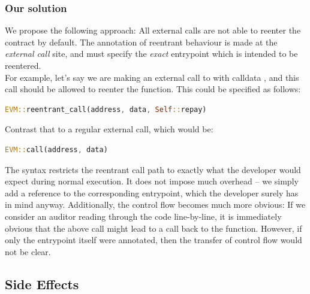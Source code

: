 \subsubsection{Our solution}
We propose the following approach: All external calls are not able to reenter the contract by default. The annotation of reentrant behaviour is made at the \textit{external call} site, and must specify the \textit{exact} entrypoint which is intended to be reentered. \\
For example, let's say we are making an external call to  with calldata , and this call should be allowed to reenter the  function. This could be specified as follows:
\begin{lstlisting}[language=Rust, style=boxed, numbers=none, framerule=0pt, numbersep=0pt, xleftmargin=5pt]
EVM::reentrant_call(address, data, Self::repay)
\end{lstlisting}
Contrast that to a regular external call, which would be:
\begin{lstlisting}[language=Rust, style=boxed, numbers=none, framerule=0pt, numbersep=0pt, xleftmargin=5pt]
EVM::call(address, data)
\end{lstlisting}
The syntax restricts the reentrant call path to exactly what the developer would expect during normal execution. It does not impose much overhead -- we simply add a reference to the corresponding entrypoint, which the developer surely has in mind anyway. Additionally, the control flow becomes much more obvious: If we consider an auditor reading through the code line-by-line, it is immediately obvious that the above call might lead to a call back to the  function. However, if only the entrypoint itself were annotated, then the transfer of control flow would not be clear.

\subsection{Side Effects}

